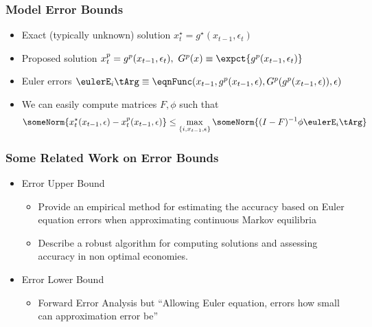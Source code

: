 \documentclass[notheorems]{beamer}
\begin{document}
\begin{frame}
  \frametitle{Model Error Bounds}
  \begin{itemize}
  \item Exact (typically unknown) solution $x^\star_t=g^\star(x_{t-1},\epsilon_t)$ 
  \item Proposed solution  $x^p_t=g^p(x_{t-1},\epsilon_t), \,\,G^p(x)\equiv \expct{g^p(x_{t-1},\epsilon_t)}$ 
 \item Euler errors $\eulerE_i\tArg \equiv  \eqnFunc(x_{t-1},g^p(x_{t-1},\epsilon),G^p(g^p(x_{t-1},\epsilon)),\epsilon)$
 \item We can easily compute matrices  $F, \phi $ such that 
 {\small   \begin{gather*}
 \someNorm{ x^\star_{t}(x_{t-1},\epsilon) -	 x^p_{t}(x_{t-1},\epsilon)} \le 
 \max_{\{i,x_{t-1},\epsilon\}} \someNorm{(I-F)^{-1} \phi \eulerE_i\tArg }
    \end{gather*}}
  \end{itemize}
\end{frame}
\begin{frame}
  \frametitle{Some Related Work on Error Bounds}
  \begin{itemize}
  \item \cite{peralta-alva14} Error Upper Bound
    \begin{itemize}
\item Provide an empirical method for estimating the accuracy based on Euler equation errors when approximating continuous Markov equilibria
    \item Describe a robust algorithm for computing solutions and assessing accuracy in non optimal economies.\cite{feng14:_num}
    \end{itemize}
  \item \cite{judd2017lower} Error Lower Bound
    \begin{itemize}
    \item Forward Error Analysis but ``Allowing Euler equation, errors how small can approximation error be''
    \end{itemize}
  \end{itemize}
\end{frame}
\end{document}
